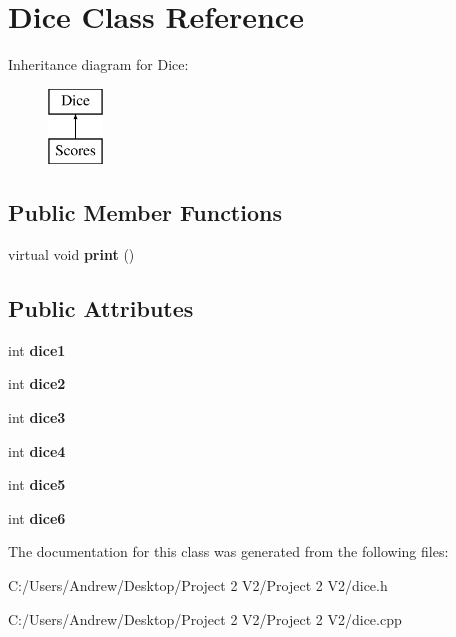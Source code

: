 \hypertarget{class_dice}{}\section{Dice Class Reference}
\label{class_dice}
Inheritance diagram for Dice\+:\begin{figure}[H]
\begin{center}
\leavevmode
\includegraphics[height=2.000000cm]{class_dice}
\end{center}
\end{figure}
\subsection*{Public Member Functions}
\begin{DoxyCompactItemize}
\item 
\mbox{\label{class_dice_aa1d3bf588284f83cb45f4b284ebcc748}} 
virtual void {\bfseries print} ()
\end{DoxyCompactItemize}
\subsection*{Public Attributes}
\begin{DoxyCompactItemize}
\item 
\mbox{\label{class_dice_ae1c369fc5164bac7ec31d7a6d5d7df1d}} 
int {\bfseries dice1}
\item 
\mbox{\label{class_dice_aaa67d915e4554b1c862f7ee0a9afff8c}} 
int {\bfseries dice2}
\item 
\mbox{\label{class_dice_a49752c1eca2817629d0406b595fd4b56}} 
int {\bfseries dice3}
\item 
\mbox{\label{class_dice_aeca1db89c9f2d16d94a0b3c7b0b9ca1c}} 
int {\bfseries dice4}
\item 
\mbox{\label{class_dice_ac0e5ca3b8134775f129c34ed9c6d616a}} 
int {\bfseries dice5}
\item 
\mbox{\label{class_dice_a86b43ccbc36a292a01f78219be7f0484}} 
int {\bfseries dice6}
\end{DoxyCompactItemize}


The documentation for this class was generated from the following files\+:\begin{DoxyCompactItemize}
\item 
C\+:/\+Users/\+Andrew/\+Desktop/\+Project 2 V2/\+Project 2 V2/dice.\+h\item 
C\+:/\+Users/\+Andrew/\+Desktop/\+Project 2 V2/\+Project 2 V2/dice.\+cpp\end{DoxyCompactItemize}
